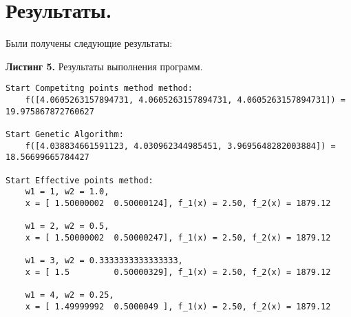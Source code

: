 \documentclass[a4paper, 12pt]{article}   	%
\begin{document}
\newpage

\section{Результаты.}
    Были получены следующие результаты:
    
    
    \textbf{Листинг 5.} Результаты выполнения программ.
    \begin{verbatim}
Start Сompetitng points method method:
    f([4.0605263157894731, 4.0605263157894731, 4.0605263157894731]) = 19.975867872760627

Start Genetic Algorithm:
    f([4.038834661591123, 4.030962344985451, 3.9695648282003884]) = 18.56699665784427
    
Start Effective points method:
    w1 = 1, w2 = 1.0, 
    x = [ 1.50000002  0.50000124], f_1(x) = 2.50, f_2(x) = 1879.12
    
    w1 = 2, w2 = 0.5, 
    x = [ 1.50000002  0.50000247], f_1(x) = 2.50, f_2(x) = 1879.12
    
    w1 = 3, w2 = 0.3333333333333333, 
    x = [ 1.5         0.50000329], f_1(x) = 2.50, f_2(x) = 1879.12
    
    w1 = 4, w2 = 0.25, 
    x = [ 1.49999992  0.5000049 ], f_1(x) = 2.50, f_2(x) = 1879.12
\end{verbatim}
\end{document}
